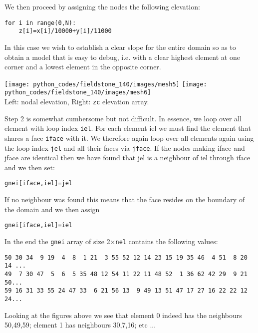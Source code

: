 We then proceed by assigning the nodes the following elevation:
\begin{lstlisting}
for i in range(0,N):
    z[i]=x[i]/10000+y[i]/11000 
\end{lstlisting}
In this case we wish to establish a clear slope for the entire domain 
so as to obtain a model that is easy to debug, i.e. with a clear 
highest element at one corner and a lowest element in the opposite corner.

\begin{center}
\texttt{[image: python\_codes/fieldstone\_140/images/mesh5]}
\texttt{[image: python\_codes/fieldstone\_140/images/mesh6]}\\
{\captionfont Left: nodal elevation, Right: {\tt zc} elevation array.}
\end{center}

Step 2 is somewhat cumbersome but not difficult. In essence, we loop over all element with 
loop index {\tt iel}. 
For each element iel we must find the element that shares a face {\tt iface} with it. 
We therefore again loop over all elements again using the loop index {\tt jel} and all their 
faces via {\tt jface}. If the nodes making iface and jface are identical then we have found that 
jel is a neighbour of iel through iface and we then set:
\begin{lstlisting}
gnei[iface,iel]=jel
\end{lstlisting}
If no neighbour was found this means that the face resides on the boundary of the domain 
and we then assign
\begin{lstlisting}
gnei[iface,iel]=iel
\end{lstlisting}
In the end the {\tt gnei} array of size 2$\times${\tt nel} contains the following values:

\begin{lstlisting}
50 30 34  9 19  4  8  1 21  3 55 52 12 14 23 15 19 35 46  4 51  8 20 14 ... 
49  7 30 47  5  6  5 35 48 12 54 11 22 11 48 52  1 36 62 42 29  9 21 50...
59 16 31 33 55 24 47 33  6 21 56 13  9 49 13 51 47 17 27 16 22 22 12 24...
\end{lstlisting}
Looking at the figures above we see that element 0 indeed has the neighbours 50,49,59;
element 1 has neighbours 30,7,16; etc ...

